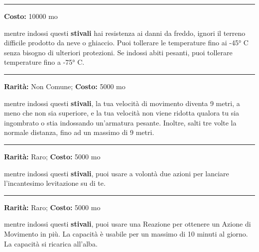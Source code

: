 \begin{multicols}{2}
\smallskip\noindent\rule{\linewidth}{2pt}  \hypertarget{Stivalidell'Inverno}{}\smallskip{}\noindent\label{Stivalidell'Inverno}

\textbf{Costo:} 10000 mo

mentre indossi questi \textbf{stivali} hai resistenza ai danni da freddo, ignori il terreno difficile prodotto da neve o ghiaccio. Puoi tollerare le temperature fino ai -45° C senza bisogno di ulteriori protezioni. Se indossi abiti pesanti, puoi tollerare temperature fino a -75° C.

\smallskip\noindent\rule{\linewidth}{2pt}  \hypertarget{StivalidellaCorsaedelSalto}{}\smallskip{}\noindent\label{StivalidellaCorsaedelSalto}

\textbf{Rarità:} Non Comune; \textbf{Costo:} 5000 mo

mentre indossi questi \textbf{stivali}, la tua velocità di movimento diventa 9 metri, a meno che non sia superiore, e la tua velocità non viene ridotta qualora tu sia ingombrato o stia indossando un'armatura pesante. Inoltre, salti tre volte la normale distanza, fino ad un massimo di 9 metri.

\smallskip\noindent\rule{\linewidth}{2pt}  \hypertarget{StivalidellaLevitazione}{}\smallskip{}\noindent\label{StivalidellaLevitazione}

\textbf{Rarità:} Raro; \textbf{Costo:} 5000 mo

mentre indossi questi \textbf{stivali}, puoi usare a volontà due azioni per lanciare l'incantesimo levitazione su di te.

\smallskip\noindent\rule{\linewidth}{2pt}  \hypertarget{StivalidellaVelocità}{}\smallskip{}\noindent\label{StivalidellaVelocità}

\textbf{Rarità:} Raro; \textbf{Costo:} 5000 mo

mentre indossi questi \textbf{stivali}, puoi usare una Reazione per ottenere un Azione di Movimento in più. La capacità è usabile per un massimo di 10 minuti al giorno. La capacità si ricarica all'alba.


\end{multicols}
